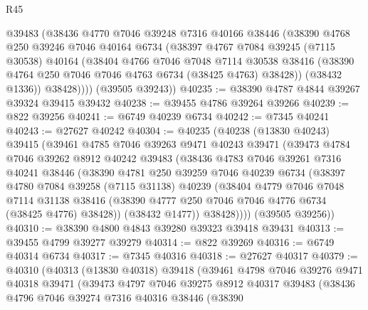 \begin{lexlean}{R45}
\begin{coremodule}
{          @39483
          (@38436
            @4770
            @7046
            @39248
            @7316
            @40166
            @38446
            (@38390
              @4768
              @250
              @39246
              @7046
              @40164
              @6734
              (@38397
                @4767
                @7084
                @39245
                (@7115 @30538)
                @40164
                (@38404
                  @4766
                  @7046
                  @7048
                  @7114
                  @30538
                  @38416
                  (@38390 @4764 @250 @7046 @7046 @4763 @6734 (@38425 @4763) @38428))
                (@38432 @1336))
              @38428))))
      (@39505 @39243))
@40235 := @38390 @4787 @4844 @39267 @39324 @39415 @39432
@40238 := @39455 @4786 @39264 @39266
@40239 := @822 @39256
@40241 := @6749 @40239 @6734
@40242 := @7345 @40241
@40243 := @27627 @40242
@40304 := @40235
    (@40238
      (@13830 @40243)
      @39415
      (@39461
        @4785
        @7046
        @39263
        @9471
        @40243
        @39471
        (@39473
          @4784
          @7046
          @39262
          @8912
          @40242
          @39483
          (@38436
            @4783
            @7046
            @39261
            @7316
            @40241
            @38446
            (@38390
              @4781
              @250
              @39259
              @7046
              @40239
              @6734
              (@38397
                @4780
                @7084
                @39258
                (@7115 @31138)
                @40239
                (@38404
                  @4779
                  @7046
                  @7048
                  @7114
                  @31138
                  @38416
                  (@38390 @4777 @250 @7046 @7046 @4776 @6734 (@38425 @4776) @38428))
                (@38432 @1477))
              @38428))))
      (@39505 @39256))
@40310 := @38390 @4800 @4843 @39280 @39323 @39418 @39431
@40313 := @39455 @4799 @39277 @39279
@40314 := @822 @39269
@40316 := @6749 @40314 @6734
@40317 := @7345 @40316
@40318 := @27627 @40317
@40379 := @40310
    (@40313
      (@13830 @40318)
      @39418
      (@39461
        @4798
        @7046
        @39276
        @9471
        @40318
        @39471
        (@39473
          @4797
          @7046
          @39275
          @8912
          @40317
          @39483
          (@38436
            @4796
            @7046
            @39274
            @7316
            @40316
            @38446
            (@38390
}
\end{coremodule}
\end{lexlean}
